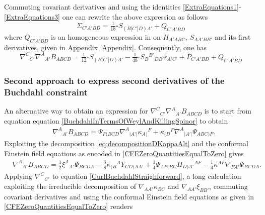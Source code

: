 \documentclass[10pt,a4paper]{article}
\theoremstyle{plain}
\begin{document}
Commuting covariant derivatives and using the identities
\eqref{ExtraEquations1}-\eqref{ExtraEquations3} one can rewrite
the above expression as
follows
\begin{equation}
\Sigma_{C'A'BD} = \tfrac{1}{18}\square S_{(B|C'|D)A'} +
Q_{C'A'BD}
\end{equation}
where $Q_{C'A'BD}$ is an homogeneous expression in on $H_{A'ABC}$,
$S_{AA'BB'}$ and its first derivatives, given in Appendix
\ref{Appendix}. Consequently, one has
\begin{equation} \label{SecondDerivativesOfBuchdahlToEquate1}
\nabla^{C}{}_{C'}\nabla^{A}{}_{A'}B_{ABCD}=\tfrac{1}{12}\square
S_{(B|C'|D)A'} -\tfrac{1}{48}\square
S_{B}{}^{B'}{}_{DB'}\bar{\epsilon}_{A'C'} + P_{C'A'BD}+Q_{C'A'BD}
\end{equation}


\subsubsection{Second approach to express second derivatives of the Buchdahl constraint}

An alternative way to obtain an expression for
$\nabla^{C}{}_{C'}\nabla^{A}{}_{A'}B_{ABCD}$ is to start from equation
equation \eqref{BuchdahlInTermsOfWeylAndKillingSpinor} to obtain
\begin{align*}
& \nabla^{A}{}_{A'}B_{ABCD} = \Psi_{F(BCD} \nabla^{A}{}_{\vert
    A'\vert}\kappa_{A)}{}^{F} + \kappa_{(D}{}^{F} \nabla^{A}{}_{\vert
    A'\vert}\Psi_{ABC)F} .
\end{align*}
Exploiting the decomposition \eqref{eq:decompositionDKappaAlt} and the
conformal Einstein field equations as encoded in
\eqref{CFEZeroQuantitiesEqualToZero} gives
\begin{align}\label{CurlBuchdahlStraighforward}
&\nabla^{A}{}_{A'}B_{ABCD} = \tfrac{1}{2} \xi^{A}{}_{A'} \Psi_{BCDA} -
  \tfrac{3}{8} \kappa_{(B}{}^{A} Y_{CD)AA'} + \tfrac{1}{4}
  \Psi_{AF(BC} H_{D)A'}{}^{AF} - \tfrac{1}{4} \kappa^{AF}
  \nabla_{FA'}\Psi_{BCDA}.
\end{align} 
Applying $\nabla^{C}{}_{C'}$ to equation
\eqref{CurlBuchdahlStraighforward}, a long calculation exploiting the
irreducible decomposition of $\nabla_{AA'}\kappa_{BC}$ and
$\nabla_{AA'}\xi_{BB'}$, commuting covariant derivatives and using the
conformal Einstein field equations as given in
\eqref{CFEZeroQuantitiesEqualToZero} renders
\end{document}
